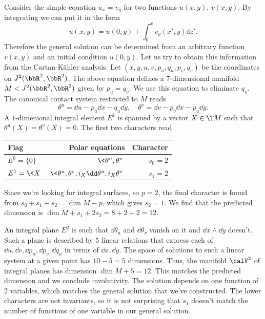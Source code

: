\begin{example}\label{ex ux=vy 1}
    Consider the simple equation $u_x=v_y$ for two functions $u(x,y)$, $v(x,y)$. By integrating we can put it in the form 
    \[u(x,y)=u(0,y)+\int_0^x v_y(x',y)\dd z'.\]
    Therefore the general solution can be determined from an arbitrary function $v(x,y)$ and an initial condition $u(0,y)$. Let us try to obtain this information from the Cartan-K\"ahler analysis. Let $(x,y,u,v,p_u,q_u,p_v,q_v)$ be the coordinates on $J^2(\bbR^2,\bbR^2)$. The above equation defines a $7$-dimensional manifold $M<J^2(\bbR^2,\bbR^2)$ given by $p_u=q_v$. We use this equation to eliminate $q_v$. The canonical contact system restricted to $M$ reads 
    \[\theta^u=\dd u-p_u\dd x-q_u\dd y,\quad \theta^v=\dd v-p_v\dd x-p_u\dd y.\]
    A $1$-dimenional integral element $E^1$ is spanned by a vector $X\in \T M$ such that $\theta^u(X)=\theta^v(X)=0$. The first two characters read 
    \begin{center}
        \begin{tabular}{l r r} 
         Flag & Polar equations & Character \\ [0.5ex] 
         \hline
         $E^0=\{0\}$ & $\<\theta^u,\theta^v\>$ & $s_0=2$ \\ 
         $E^1=\<X\>$ & $\<\theta^u,\theta^v,i_X\dd\theta^u,i_X\theta^v\>$ & $s_1=2$ \\
         \hline
        \end{tabular}
    \end{center}
    Since we're looking for integral surfaces, so $p=2$, the final character is found from $s_0+s_1+s_2=\dim M-p$, which gives $s_2=1$.
    We find that the predicted dimension is $\dim M+s_1+2s_2=8+2+2=12$. 

    An integral plane $E^2$ is such that $\dd\theta_u$ and $\dd\theta_v$ vanish on it and $\dd x\wedge\dd y$ doesn't. Such a plane is described by $5$ linear relations that express each of $\dd u,\dd v,\dd p_u,\dd p_v,\dd q_u$ in terms of $\dd x,\dd y$. The space of solutions to such a linear system at a given point has $10-5=5$ dimensions. Thus, the manifold $\calV^2$ of integral planes has dimension $\dim M+5=12$. This matches the predicted dimension and we conclude involutivity. The solution depends on one function of $2$ variables, which matches the general solution that we've constructed. The lower characters are not invariants, so it is not surprising that $s_1$ doesn't match the number of functions of one variable in our general solution.
\end{example}


